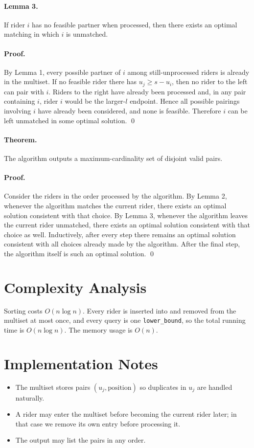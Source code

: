 \documentclass[11pt]{article}
\begin{document}
\paragraph{Lemma 3.}
If rider $i$ has no feasible partner when processed, then there exists an optimal matching in which $i$ is
unmatched.

\paragraph{Proof.}
By Lemma 1, every possible partner of $i$ among still-unprocessed riders is already in the multiset. If no
feasible rider there has $u_j \ge s - u_i$, then no rider to the left can pair with $i$. Riders to the right have
already been processed and, in any pair containing $i$, rider $i$ would be the larger-$l$ endpoint. Hence
all possible pairings involving $i$ have already been considered, and none is feasible. Therefore $i$ can be
left unmatched in some optimal solution. \qed

\paragraph{Theorem.}
The algorithm outputs a maximum-cardinality set of disjoint valid pairs.

\paragraph{Proof.}
Consider the riders in the order processed by the algorithm. By Lemma 2, whenever the algorithm matches
the current rider, there exists an optimal solution consistent with that choice. By Lemma 3, whenever the
algorithm leaves the current rider unmatched, there exists an optimal solution consistent with that choice as
well. Inductively, after every step there remains an optimal solution consistent with all choices already made
by the algorithm. After the final step, the algorithm itself is such an optimal solution. \qed

\section*{Complexity Analysis}

Sorting costs $O(n \log n)$. Every rider is inserted into and removed from the multiset at most once, and
every query is one \texttt{lower\_bound}, so the total running time is $O(n \log n)$. The memory usage is
$O(n)$.

\section*{Implementation Notes}

\begin{itemize}[leftmargin=*]
    \item The multiset stores pairs $(u_j,\text{position})$ so duplicates in $u_j$ are handled naturally.
    \item A rider may enter the multiset before becoming the current rider later; in that case we remove its
    own entry before processing it.
    \item The output may list the pairs in any order.
\end{itemize}
\end{document}
